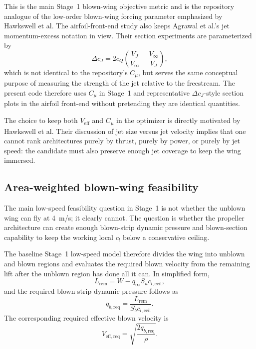 \documentclass[conf]{new-aiaa}
\begin{document}
This is the main Stage~1 blown-wing objective metric and is the repository analogue of the low-order blown-wing forcing parameter emphasized by Hawkswell et al.\cite{Hawkswell2022} The airfoil-front-end study also keeps Agrawal et al.'s jet momentum-excess notation in view. Their section experiments are parameterized by
\begin{equation}
\Delta c_J = 2c_Q\left(\frac{V_J}{V_\infty} - \frac{V_\infty}{V_J}\right),
\end{equation}
which is not identical to the repository's \(C_\mu\), but serves the same conceptual purpose of measuring the strength of the jet relative to the freestream.\cite{Agrawal2019} The present code therefore uses \(C_\mu\) in Stage~1 and representative \(\Delta c_J\)-style section plots in the airfoil front-end without pretending they are identical quantities.

The choice to keep both \(V_{\mathrm{eff}}\) and \(C_\mu\) in the optimizer is directly motivated by Hawkswell et al. Their discussion of jet size versus jet velocity implies that one cannot rank architectures purely by thrust, purely by power, or purely by jet speed: the candidate must also preserve enough jet coverage to keep the wing immersed.\cite{Hawkswell2022}

\subsection{Area-weighted blown-wing feasibility}

The main low-speed feasibility question in Stage~1 is not whether the unblown wing can fly at \SI{4}{m/s}; it clearly cannot. The question is whether the propeller architecture can create enough blown-strip dynamic pressure and blown-section capability to keep the working local \(c_l\) below a conservative ceiling.

The baseline Stage~1 low-speed model therefore divides the wing into unblown and blown regions and evaluates the required blown velocity from the remaining lift after the unblown region has done all it can. In simplified form,
\begin{equation}
L_{\mathrm{rem}} = W - q_\infty S_u c_{l,\mathrm{ceil}},
\end{equation}
and the required blown-strip dynamic pressure follows as
\begin{equation}
q_{b,\mathrm{req}} = \frac{L_{\mathrm{rem}}}{S_b c_{l,\mathrm{ceil}}}.
\end{equation}
The corresponding required effective blown velocity is
\begin{equation}
V_{\mathrm{eff,req}} = \sqrt{\frac{2q_{b,\mathrm{req}}}{\rho}}.
\end{equation}
\end{document}
